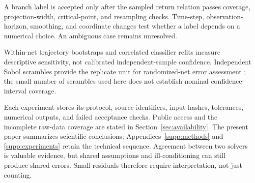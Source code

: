 A branch label is accepted only after the sampled return relation passes
coverage, projection-width, critical-point, and resampling checks. Time-step,
observation-horizon, smoothing, and coordinate changes test whether a label
depends on a numerical choice. An ambiguous case remains unresolved.

Within-net trajectory bootstraps and correlated classifier refits measure
descriptive sensitivity, not calibrated independent-sample confidence.
Independent Sobol scrambles provide the replicate unit for randomized-net
error assessment \citep{owen2025error}; the small number of scrambles used
here does not establish nominal confidence-interval coverage.

Each experiment stores its protocol, source identifiers, input hashes,
tolerances, numerical outputs, and failed acceptance checks. Public access
and the incomplete raw-data coverage are stated in Section~\ref{sec:availability}.
The present
paper summarizes scientific conclusions; Appendices~\ref{supp:methods} and
\ref{supp:experiments} retain the technical sequence. Agreement between two
solvers is valuable evidence, but shared assumptions and ill-conditioning
can still produce shared errors. Small residuals therefore require
interpretation, not just counting.
